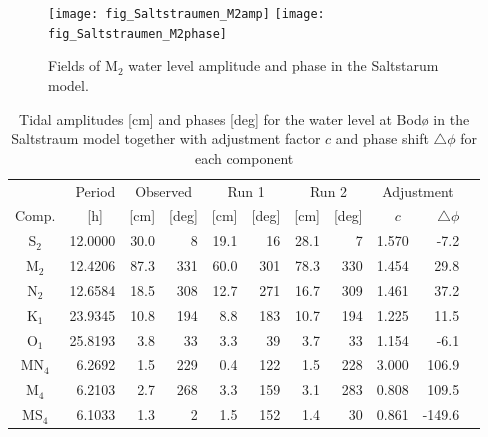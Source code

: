 \begin{figure}[!t]
\centering
\texttt{[image: fig\_Saltstraumen\_M2amp]}
\texttt{[image: fig\_Saltstraumen\_M2phase]}
\caption{Fields of M$_2$ water level amplitude and phase in the Saltstarum model.}
\label{fig:Saltstraumen_field}
\end{figure}

\begin{table}[ht]
\caption{Tidal amplitudes [cm] and phases [deg] for the water level at Bod{\o} in the Saltstraum model together with adjustment factor $c$ and phase shift $\triangle \phi$ for each component}
\label{tab:Bodo}
\centering
\begin{tabular}{crrrrrrrrrr} \hline
      & Period & \multicolumn{2}{c}{Observed} & \multicolumn{2}{c}{Run 1} & \multicolumn{2}{c}{Run 2} & \multicolumn{2}{c}{Adjustment} \\
Comp. & [h] $\;\;$ & [cm] & [deg] & [cm] & [deg] & [cm] & [deg] & $c\;\;$ & $\triangle \phi$  \\ \hline 
S$_2$   & 12.0000  &  30.0 &      8   &  19.1 &     16   &  28.1 &      7    &   1.570  &    -7.2   \\ 
M$_2$   & 12.4206  &  87.3 &    331   &  60.0 &    301   &  78.3 &    330    &   1.454  &    29.8   \\ 
N$_2$   & 12.6584  &  18.5 &    308   &  12.7 &    271   &  16.7 &    309    &   1.461  &    37.2   \\ 
K$_1$   & 23.9345  &  10.8 &    194   &   8.8 &    183   &  10.7 &    194    &   1.225  &    11.5   \\ 
O$_1$   & 25.8193  &   3.8 &     33   &   3.3 &     39   &   3.7 &     33    &   1.154  &    -6.1   \\ 
MN$_4$  &  6.2692  &   1.5 &    229   &   0.4 &    122   &   1.5 &    228    &   3.000  &   106.9   \\ 
M$_4$   &  6.2103  &   2.7 &    268   &   3.3 &    159   &   3.1 &    283    &   0.808  &   109.5   \\ 
MS$_4$  &  6.1033  &   1.3 &      2   &   1.5 &    152   &   1.4 &     30    &   0.861  &  -149.6   \\ \hline
\end{tabular}
\end{table}
